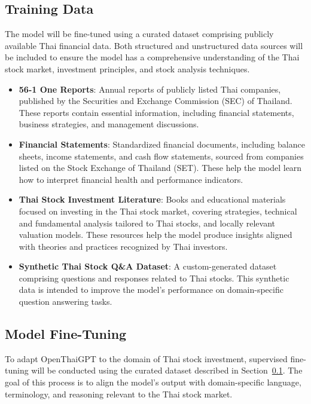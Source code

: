 \subsection{Training Data}
\label{subsection:training-data}

The model will be fine-tuned using a curated dataset comprising publicly available Thai financial data. 
Both structured and unstructured data sources will be included to ensure the model has a comprehensive understanding of the Thai stock market, investment principles, and stock analysis techniques.

\begin{itemize}[leftmargin=60pt]
    \item \textbf{56-1 One Reports}: Annual reports of publicly listed Thai companies, published by the Securities and Exchange Commission (SEC) of Thailand. These reports contain essential information, including financial statements, business strategies, and management discussions.
    \item \textbf{Financial Statements}: Standardized financial documents, including balance sheets, income statements, and cash flow statements, sourced from companies listed on the Stock Exchange of Thailand (SET). These help the model learn how to interpret financial health and performance indicators.
    \item \textbf{Thai Stock Investment Literature}: Books and educational materials focused on investing in the Thai stock market, covering strategies, technical and fundamental analysis tailored to Thai stocks, and locally relevant valuation models. These resources help the model produce insights aligned with theories and practices recognized by Thai investors.
    \item \textbf{Synthetic Thai Stock Q\&A Dataset}: A custom-generated dataset comprising questions and responses related to Thai stocks. This synthetic data is intended to improve the model’s performance on domain-specific question answering tasks.
\end{itemize}

\subsection{Model Fine-Tuning}
\label{subsection:model-fine-tuning}

To adapt OpenThaiGPT to the domain of Thai stock investment, supervised fine-tuning will be conducted using the curated dataset described in Section~\ref{subsection:training-data}. 
The goal of this process is to align the model’s output with domain-specific language, terminology, and reasoning relevant to the Thai stock market.

